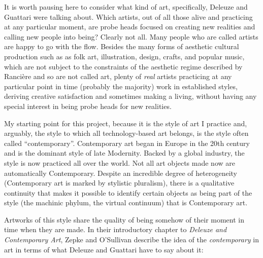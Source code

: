         It is worth pausing here to consider what kind of art, specifically, Deleuze and Guattari were talking about. Which artists, out of all those alive and practicing at any particular moment, are probe heads focused on creating new realities and calling new people into being? Clearly not all. Many people who are called artists are happy to go with the flow. Besides the many forms of aesthetic cultural production such as as folk art, illustration, design, crafts, and popular music, which are not subject to the constraints of the aesthetic regime described by Rancière and so are not called art, plenty of \emph{real} artists practicing at any particular point in time (probably the majority) work in established styles, deriving creative satisfaction and sometimes making a living, without having any special interest in being probe heads for new realities.

        My starting point for this project, because it is the style of art I practice and, arguably, the style to which all technology-based art belongs, is the style often called “contemporary”. Contemporary art began in Europe in the 20th century and is the dominant style of late Modernity. Backed by a global industry, the style is now practiced all over the world. Not all art objects made now are automatically Contemporary. Despite an incredible degree of heterogeneity (Contemporary art is marked by stylistic pluralism), there is a qualitative continuity that makes it possible to identify certain objects as being part of the style (the machinic phylum, the virtual continuum) that is Contemporary art.
        
        Artworks of this style share the quality of being somehow of their moment in time when they are made. In their introductory chapter to \emph{Deleuze and Contemporary Art}, Zepke and O'Sullivan describe the idea of the \emph{contemporary} in art in terms of what Deleuze and Guattari have to say about it:

